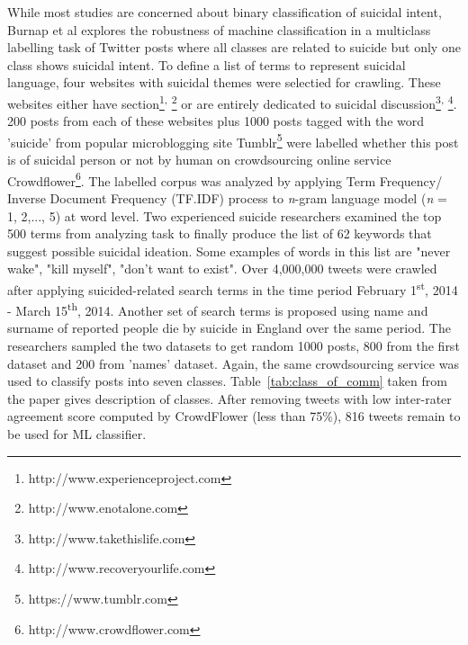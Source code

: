 While most studies are concerned about binary classification of suicidal intent, Burnap et al \cite{Burnap2015} explores the robustness of machine classification in a multiclass labelling task of Twitter posts where all classes are related to suicide but only one class shows suicidal intent. To define a list of terms to represent suicidal language, four websites with suicidal themes were selectied for crawling. These websites either have section\footnote{http://www.experienceproject.com}\textsuperscript{, }\footnote{http://www.enotalone.com} or are entirely dedicated to suicidal discussion\footnote{http://www.takethislife.com}\textsuperscript{, }\footnote{http://www.recoveryourlife.com}. 200 posts from each of these websites plus 1000 posts tagged with the word 'suicide' from popular microblogging site Tumblr\footnote{https://www.tumblr.com} were labelled whether this post is of suicidal person or not by human on crowdsourcing online service Crowdflower\footnote{http://www.crowdflower.com}. The labelled corpus was analyzed by applying Term Frequency/ Inverse Document Frequency (TF.IDF) process to \textit{n}-gram language model (\textit{n} = 1, 2,..., 5) at word level. Two experienced suicide researchers examined the top 500 terms from analyzing task to finally produce the list of 62 keywords that suggest possible suicidal ideation. Some examples of words in this list are "never wake", "kill myself", "don't want to exist". Over 4,000,000 tweets were crawled after applying suicided-related search terms in the time period  February 1\textsuperscript{st}, 2014 - March 15\textsuperscript{th}, 2014. Another set of search terms is proposed using name and surname of reported people die by suicide in England over the same period. The researchers sampled the two datasets to get random 1000 posts, 800 from the first dataset and 200 from 'names' dataset. Again, the same crowdsourcing service was used to classify posts into seven classes. Table~\ref{tab:class_of_comm} taken from the paper \cite{Burnap2015} gives description of classes. After removing tweets with low inter-rater agreement score computed by CrowdFlower (less than 75\%), 816 tweets remain to be used for ML classifier.

